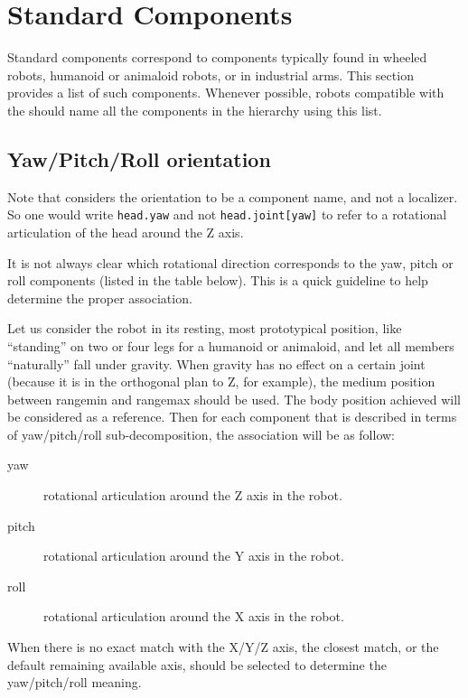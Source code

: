 \section{Standard Components}

Standard components correspond to components typically found in wheeled
robots, humanoid or animaloid robots, or in industrial arms. This section
provides a list of such components. Whenever possible, robots compatible with
the \gsrapi should name all the components in the hierarchy using this list.

\subsection{Yaw/Pitch/Roll orientation}
\label{sec:naming:ypr}

Note that \gsrapi considers the orientation to be a component name, and not
a localizer. So one would write \lstinline|head.yaw| and not
\lstinline|head.joint[yaw]| to refer to a rotational articulation of the
head around the Z axis.

It is not always clear which rotational direction corresponds to the
yaw, pitch or roll components (listed in the table below). This is a
quick guideline to help determine the proper association.

Let us consider the robot in its resting, most prototypical position,
like ``standing'' on two or four legs for a humanoid or animaloid, and
let all members ``naturally'' fall under gravity. When gravity has no
effect on a certain joint (because it is in the orthogonal plan to Z,
for example), the medium position between rangemin and rangemax should
be used. The body position achieved will be considered as a reference.
Then for each component that is described in terms of yaw/pitch/roll
sub-decomposition, the association will be as follow:

\begin{description}
\item[yaw] rotational articulation around the Z axis in the robot.
\item[pitch] rotational articulation around the Y axis in the robot.
\item[roll] rotational articulation around the X axis in the robot.
\end{description}

When there is no exact match with the X/Y/Z axis, the closest match, or
the default remaining available axis, should be selected to determine
the yaw/pitch/roll meaning.


